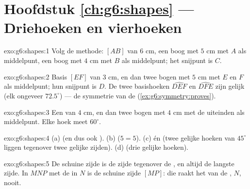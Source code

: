 \section*{Hoofdstuk \ref{ch:g6:shapes} --- Driehoeken en vierhoeken}

\begin{solution}{exo:g6:shapes:1}
Volg de methode:  $[AB]$ van $6$ cm, een boog met  $5$ cm met $A$
als middelpunt, een boog met  $4$ cm met $B$ als middelpunt; het snijpunt
is $C$.
\end{solution}

\begin{solution}{exo:g6:shapes:2}
Basis $[EF]$ van $3$ cm, en dan twee bogen met  $5$ cm met $E$ en $F$ als
middelpunt; hun snijpunt is $D$. De twee basishoeken $\widehat{DEF}$ en
$\widehat{DFE}$ zijn gelijk (elk ongeveer $72.5^\circ$) --- de symmetrie van de
 (\cref{ex:g6:symmetry:proves}).
\end{solution}

\begin{solution}{exo:g6:shapes:3}
Een  van $4$ cm, en dan twee bogen met  $4$ cm met de uiteinden
als middelpunt. Elke hoek meet $60^\circ$.
\end{solution}

\begin{solution}{exo:g6:shapes:4}
(a)  (en dus ook ). \quad
(b)  ($5 = 5$). \quad
(c)  én  (twee gelijke hoeken van $45^\circ$ liggen
tegenover twee gelijke zijden). \quad
(d)  (drie gelijke hoeken).
\end{solution}

\begin{solution}{exo:g6:shapes:5}
De schuine zijde is de zijde tegenover de , en altijd de langste
zijde. In $MNP$ met de  in $N$ is de schuine zijde $[MP]$: die raakt
het  van de , $N$, nooit.
\end{solution}

